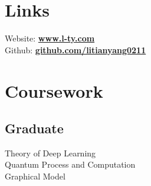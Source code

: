 \documentclass[letterpaper]{deedy-resume} %
\begin{document}

\lastupdated %



\begin{minipage}[t]{0.33\textwidth} %


\section{Links} 
Website: \href{https://www.l-ty.com}{\bf www.l-ty.com} \\
Github: \href{https://github.com/litianyang0211}{\bf github.com/litianyang0211} \\

\sectionspace %


\section{Coursework}
\subsection{Graduate}
Theory of Deep Learning \\
Quantum Process and Computation \\
Graphical Model \\


\end{minipage}
\end{document}
